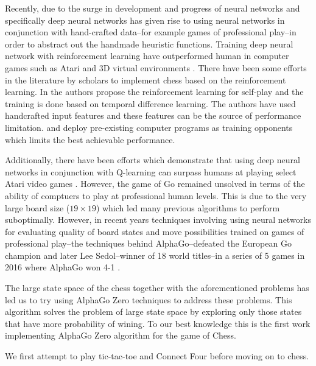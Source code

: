 \documentclass[english]{article}
\begin{document}
Recently, due to the surge in development and progress of neural networks and
specifically deep neural networks has given rise to using neural networks in
conjunction with hand-crafted data--for example games of professional play--in
order to abstract out the handmade heuristic functions.
Training deep neural network with reinforcement learning have outperformed
human in computer games such as Atari and 3D virtual environments
\cite{eight, nine, ten}. There have been some efforts in the literature by
scholars to implement chess based on the reinforcement learning. In
\cite{one, two, three} the authors propose the reinforcement learning for 
self-play and the training is done based on temporal difference learning.
The authors have used handcrafted input features and these features
can be the source of performance limitation. \cite{one} and \cite{two} deploy pre-existing
computer programs as training opponents which limits the best achievable
performance.

Additionally, there have been efforts which demonstrate that using deep neural
networks in conjunction with Q-learning can surpass humans at playing select
Atari video games \cite{DQN}. However, the game of Go remained unsolved in terms
of the ability of comptuers to play at professional human levels. This is due
to the very large board size ($19 \times 19$) which led many previous algorithms
to perform suboptimally. However, in recent years techniques involving using
neural networks for evaluating quality of board states and move possibilities
trained on games of professional play--the techniques behind AlphaGo--defeated the
European Go champion and later Lee Sedol--winner of 18 world titles--in a series
of 5 games in 2016 where AlphaGo won 4-1 \cite{AlphaGo, deepmind}.

The large state space of the chess together with the
aforementioned problems has led us to try using AlphaGo Zero techniques
to address these problems. This algorithm solves the problem
of large state space by exploring only those states that have more
probability of wining. To our best knowledge this is the first work
implementing AlphaGo Zero algorithm for the game of Chess.

We first attempt to play tic-tac-toe and Connect Four before moving on to chess.
\end{document}
